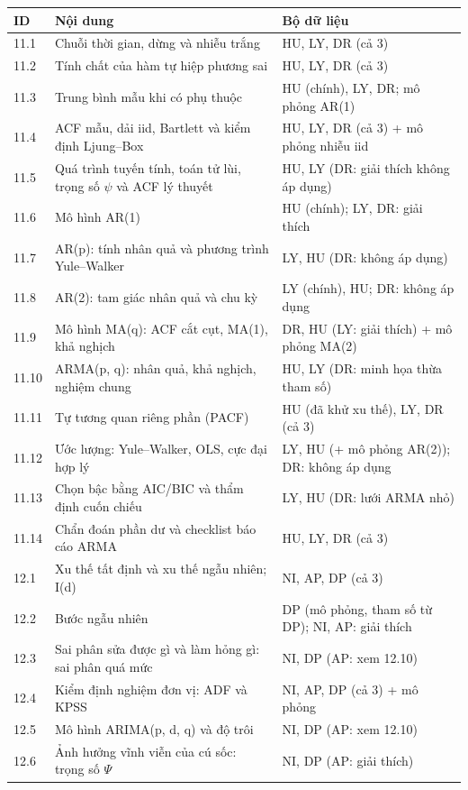 \begin{longtable}{@{}p{1.1cm}p{8.2cm}p{5cm}@{}}
\toprule
ID & Nội dung & Bộ dữ liệu \\
\midrule
\endhead
11.1 & Chuỗi thời gian, dừng và nhiễu trắng & HU, LY, DR (cả 3) \\
11.2 & Tính chất của hàm tự hiệp phương sai & HU, LY, DR (cả 3) \\
11.3 & Trung bình mẫu khi có phụ thuộc & HU (chính), LY, DR; mô phỏng AR(1) \\
11.4 & ACF mẫu, dải iid, Bartlett và kiểm định Ljung–Box & HU, LY, DR (cả 3) + mô phỏng nhiễu iid \\
11.5 & Quá trình tuyến tính, toán tử lùi, trọng số $\psi$ và ACF lý thuyết & HU, LY (DR: giải thích không áp dụng) \\
11.6 & Mô hình AR(1) & HU (chính); LY, DR: giải thích \\
11.7 & AR(p): tính nhân quả và phương trình Yule–Walker & LY, HU (DR: không áp dụng) \\
11.8 & AR(2): tam giác nhân quả và chu kỳ & LY (chính), HU; DR: không áp dụng \\
11.9 & Mô hình MA(q): ACF cắt cụt, MA(1), khả nghịch & DR, HU (LY: giải thích) + mô phỏng MA(2) \\
11.10 & ARMA(p, q): nhân quả, khả nghịch, nghiệm chung & HU, LY (DR: minh họa thừa tham số) \\
11.11 & Tự tương quan riêng phần (PACF) & HU (đã khử xu thế), LY, DR (cả 3) \\
11.12 & Ước lượng: Yule–Walker, OLS, cực đại hợp lý & LY, HU (+ mô phỏng AR(2)); DR: không áp dụng \\
11.13 & Chọn bậc bằng AIC/BIC và thẩm định cuốn chiếu & LY, HU (DR: lưới ARMA nhỏ) \\
11.14 & Chẩn đoán phần dư và checklist báo cáo ARMA & HU, LY, DR (cả 3) \\
12.1 & Xu thế tất định và xu thế ngẫu nhiên; I(d) & NI, AP, DP (cả 3) \\
12.2 & Bước ngẫu nhiên & DP (mô phỏng, tham số từ DP); NI, AP: giải thích \\
12.3 & Sai phân sửa được gì và làm hỏng gì: sai phân quá mức & NI, DP (AP: xem 12.10) \\
12.4 & Kiểm định nghiệm đơn vị: ADF và KPSS & NI, AP, DP (cả 3) + mô phỏng \\
12.5 & Mô hình ARIMA(p, d, q) và độ trôi & NI, DP (AP: xem 12.10) \\
12.6 & Ảnh hưởng vĩnh viễn của cú sốc: trọng số $\Psi$ & NI, DP (AP: giải thích) \\

\end{longtable}
